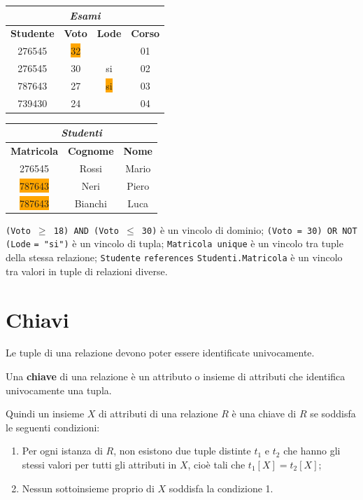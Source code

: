 \begin{Example}{}{}
    \begin{center}
        \begin{tabular}{|c|c|c|c|}
            \hline\multicolumn{4}{|c|}{\textit{Esami}}\\\hline
            \textbf{Studente} & \textbf{Voto} & \textbf{Lode} & \textbf{Corso}\\\hline
            276545 & \colorbox{orange}{32} & & 01\\
            276545 & 30 & si & 02\\
            787643 & 27 & \colorbox{orange}{si} & 03\\
            739430 & 24 & & 04\\\hline
        \end{tabular}
        \begin{tabular}{|c|c|c|}
            \hline\multicolumn{3}{|c|}{\textit{Studenti}}\\\hline
            \textbf{Matricola} & \textbf{Cognome} & \textbf{Nome}\\\hline
            276545 & Rossi & Mario\\
            \colorbox{orange}{787643} & Neri & Piero\\
            \colorbox{orange}{787643} & Bianchi & Luca\\\hline
        \end{tabular}
        \bigskip
    \end{center}
    \verb|(Voto |$\geq$\verb| 18) AND (Voto |$\leq$\verb| 30)| è un vincolo di dominio; \verb|(Voto = 30) OR NOT (Lode| \verb|= "si")| è un vincolo di tupla; \verb|Matricola unique| è un vincolo tra tuple della stessa relazione; \verb|Studente| \verb|references| \verb|Studenti.Matricola| è un vincolo tra valori in tuple di relazioni diverse.
\end{Example}

\section{Chiavi}
Le tuple di una relazione devono poter essere identificate univocamente.
\begin{redbar}
    Una \textbf{chiave} di una relazione è un attributo o insieme di attributi che identifica univocamente una tupla.
\end{redbar}

Quindi un insieme $X$ di attributi di una relazione $R$ è una chiave di $R$ se soddisfa le seguenti condizioni: 
\begin{enumerate}
    \item Per ogni istanza di $R$, non esistono due tuple distinte $t_1$ e $t_2$ che hanno gli stessi valori per tutti gli attributi in $X$, cioè tali che $t_1[X] = t_2[X]$;
    \item Nessun sottoinsieme proprio di $X$ soddisfa la condizione 1.
\end{enumerate}

